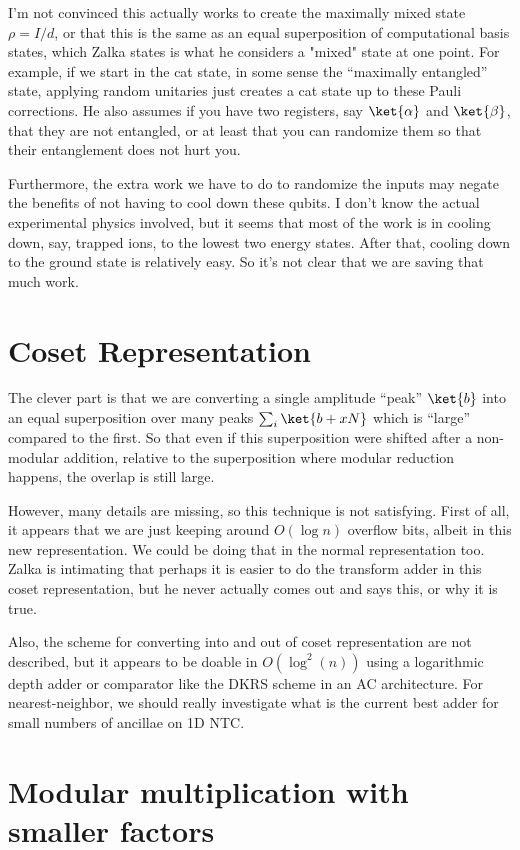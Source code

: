 \documentclass{article}
\begin{document}
I'm not convinced this actually works to create the maximally mixed state
$\rho = I / d$, or that this is the same as an equal superposition of computational
basis states, which Zalka states is what he considers a "mixed" state at one
point. For example, if we start in the cat state, in some sense the
``maximally entangled'' state, applying random unitaries just creates a
cat state up to these Pauli corrections. He also assumes if you have two
registers, say $\ket{\alpha}$ and $\ket{\beta}$, that they are not entangled,
or at least that you can randomize them so that their entanglement does not
hurt you.

Furthermore, the extra work we have to do to randomize the inputs may
negate the benefits of not having to cool down these qubits. I don't know
the actual experimental physics involved, but it seems that most of the work
is in cooling down, say, trapped ions, to the lowest two energy states.
After that, cooling down to the ground state is relatively easy. So it's not
clear that we are saving that much work.

\section{Coset Representation}

The clever part is that we are converting a single amplitude ``peak''
$\ket{b}$ into an equal superposition over many peaks
$\sum_{i} \ket{b+xN}$ which is ``large''
compared to the first. So that even if this superposition were shifted
after a non-modular addition, relative to the superposition where
modular reduction happens, the overlap is still large.

However, many details are missing, so this technique is not satisfying.
First of all, it appears that we are just keeping around $O(\log n)$ overflow
bits, albeit in this new representation. We could be doing that in the
normal representation too. Zalka is intimating that perhaps it is
easier to do the transform adder in this coset representation, but he
never actually comes out and says this, or why it is true.

Also, the scheme for converting into and out of coset representation
are not described, but it appears to be doable in $O(\log^2(n))$ using
a logarithmic depth adder or comparator like the DKRS scheme in an AC
architecture. For nearest-neighbor, we should really investigate what is
the current best adder for small numbers of ancillae on 1D NTC.

\section{Modular multiplication with smaller factors}
\end{document}
